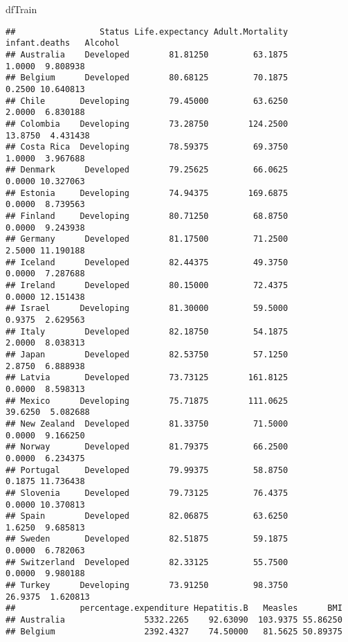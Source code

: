 \documentclass[
]{article}
\newenvironment{Shaded}{\begin{snugshade}}{\end{snugshade}}
\newcommand{\NormalTok}[1]{#1}
\begin{document}
\begin{Shaded}
\begin{Highlighting}[]
\NormalTok{dfTrain}
\end{Highlighting}
\end{Shaded}

\begin{verbatim}
##                 Status Life.expectancy Adult.Mortality infant.deaths   Alcohol
## Australia    Developed        81.81250         63.1875        1.0000  9.808938
## Belgium      Developed        80.68125         70.1875        0.2500 10.640813
## Chile       Developing        79.45000         63.6250        2.0000  6.830188
## Colombia    Developing        73.28750        124.2500       13.8750  4.431438
## Costa Rica  Developing        78.59375         69.3750        1.0000  3.967688
## Denmark      Developed        79.25625         66.0625        0.0000 10.327063
## Estonia     Developing        74.94375        169.6875        0.0000  8.739563
## Finland     Developing        80.71250         68.8750        0.0000  9.243938
## Germany      Developed        81.17500         71.2500        2.5000 11.190188
## Iceland      Developed        82.44375         49.3750        0.0000  7.287688
## Ireland      Developed        80.15000         72.4375        0.0000 12.151438
## Israel      Developing        81.30000         59.5000        0.9375  2.629563
## Italy        Developed        82.18750         54.1875        2.0000  8.038313
## Japan        Developed        82.53750         57.1250        2.8750  6.888938
## Latvia       Developed        73.73125        161.8125        0.0000  8.598313
## Mexico      Developing        75.71875        111.0625       39.6250  5.082688
## New Zealand  Developed        81.33750         71.5000        0.0000  9.166250
## Norway       Developed        81.79375         66.2500        0.0000  6.234375
## Portugal     Developed        79.99375         58.8750        0.1875 11.736438
## Slovenia     Developed        79.73125         76.4375        0.0000 10.370813
## Spain        Developed        82.06875         63.6250        1.6250  9.685813
## Sweden       Developed        82.51875         59.1875        0.0000  6.782063
## Switzerland  Developed        82.33125         55.7500        0.0000  9.980188
## Turkey      Developing        73.91250         98.3750       26.9375  1.620813
##             percentage.expenditure Hepatitis.B   Measles      BMI
## Australia                5332.2265    92.63090  103.9375 55.86250
## Belgium                  2392.4327    74.50000   81.5625 50.89375

\end{verbatim}
\end{document}
